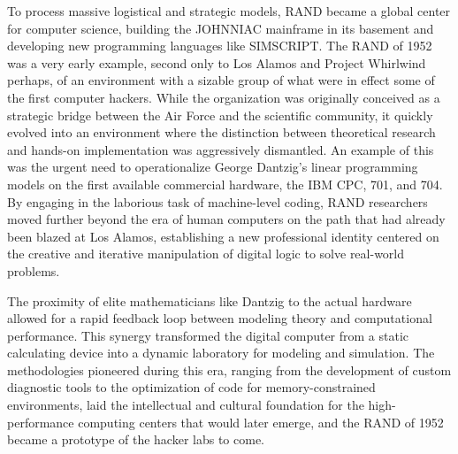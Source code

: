 To process massive logistical and strategic models, RAND became a global center for computer science, building the JOHNNIAC mainframe in its basement and developing new programming languages like SIMSCRIPT. The RAND of 1952 was a very early example, second only to Los Alamos and Project Whirlwind perhaps, of an environment with a sizable group of what were in effect some of the first computer hackers. While the organization was originally conceived as a strategic bridge between the Air Force and the scientific community, it quickly evolved into an environment where the distinction between theoretical research and hands-on implementation was aggressively dismantled. An example of this was the urgent need to operationalize George Dantzig’s linear programming models on the first available commercial hardware, the IBM CPC, 701, and 704. By engaging in the laborious task of machine-level coding, RAND researchers moved further beyond the era of human computers on the path that had already been blazed at Los Alamos, establishing a new professional identity centered on the creative and iterative manipulation of digital logic to solve real-world problems. 

The proximity of elite mathematicians like Dantzig to the actual hardware allowed for a rapid feedback loop between modeling theory and computational performance. This synergy transformed the digital computer from a static calculating device into a dynamic laboratory for modeling and simulation. The methodologies pioneered during this era, ranging from the development of custom diagnostic tools to the optimization of code for memory-constrained environments, laid the intellectual and cultural foundation for the high-performance computing centers that would later emerge, and the RAND of 1952 became a prototype of the hacker labs to come. 

